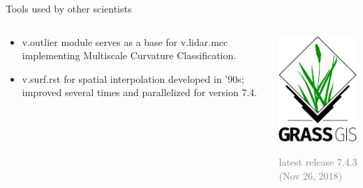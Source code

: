 \documentclass[xcolor={dvipsnames,usenames},beamer,aspectratio=169]{beamer}
\begin{document}
\begin{frame}{Tools used by other scientists}

\begin{columns}
\begin{column}{0.6\textwidth}

\begin{itemize}
  \item v.outlier module serves as a base for v.lidar.mcc implementing Multiscale Curvature Classification.
  \item v.surf.rst for spatial interpolation developed in ’90s; improved several times and parallelized for version 7.4.
\end{itemize}

\end{column}
\begin{column}{0.3\textwidth}

\begin{center}
  \includegraphics[width=\textwidth]{logos/grass_gis}
\end{center}

\vspace*{-1ex}

\textcolor{gray}{
\footnotesize
latest release 7.4.3
\scriptsize
(Nov 26, 2018)
}

\end{column}
\end{columns}

\end{frame}
\end{document}
